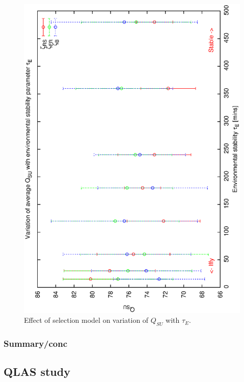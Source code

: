 \begin{figure}[h]

\begin{center}
 \includegraphics[scale=0.5, angle=-90]{figures/all_de.eps}
 \caption[Effect of selection model on variation of $Q_{SU}$ with $\tau_E$.] 
   {Effect of selection model on variation of $Q_{SU}$ with $\tau_E$.} 
\label{fig:qsu_de_allcomp}
\end{center}
\end{figure}

\subsubsection{Summary/conc}

\subsection{QLAS study}

